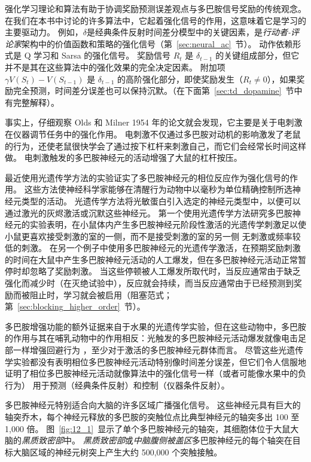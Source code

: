 强化学习理论和算法有助于协调奖励预测误差观点与多巴胺信号奖励的传统观念。
在我们在本书中讨论的许多算法中，它起着强化信号的作用，这意味着它是学习的主要驱动力。
例如，$ \delta $是经典条件反射时间差分模型中的关键因素，是\textit{行动者-评论家}架构中的价值函数和策略的强化信号（第~\ref{sec:neural_ac}~节）。
动作依赖形式是 Q 学习和 Sarsa 的强化信号。
奖励信号 $ R_t $ 是 $ \delta_{t-1} $ 的关键组成部分，但它并不是其在这些算法中的强化效果的完全决定因素。
附加项 $ \gamma V(S_t) - V(S_{t-1}) $ 是 $ \delta_{t-1} $ 的高阶强化部分，即使奖励发生（$ R_t \neq 0 $），如果奖励完全预测，时间差分误差也可以保持沉默。（在下面第~\ref{sec:td_dopamine}~节中有完整解释）。


事实上，仔细观察 Olds 和 Milner 1954 年的论文就会发现，它主要是关于电刺激在仪器调节任务中的强化作用。
电刺激不仅通过多巴胺对动机的影响激发了老鼠的行为，还使老鼠很快学会了通过按下杠杆来刺激自己，而它们会经常长时间这样做。
电刺激触发的多巴胺神经元的活动增强了大鼠的杠杆按压。


最近使用光遗传学方法的实验证实了多巴胺神经元的相位反应作为强化信号的作用。
这些方法使神经科学家能够在清醒行为动物中以毫秒为单位精确控制所选神经元类型的活动。
光遗传学方法将光敏蛋白引入选定的神经元类型中，以便可以通过激光的灰烬激活或沉默这些神经元。
第一个使用光遗传学方法研究多巴胺神经元的实验表明，在小鼠体内产生多巴胺神经元阶段性激活的光遗传学刺激足以使小鼠更喜欢接受刺激的室的一侧，而不是接受刺激的室的另一侧 无刺激或频率较低的刺激\cite{tsai2009phasic}。
在另一个例子中\cite{steinberg2013causal}使用多巴胺神经元的光遗传学激活，在预期奖励刺激的时间在大鼠中产生多巴胺神经元活动的人工爆发，但在多巴胺神经元活动正常暂停时却忽略了奖励刺激。
当这些停顿被人工爆发所取代时，当反应通常由于缺乏强化而减少时（在灭绝试验中），反应就会持续，而当反应通常由于已经预测到奖励而被阻止时，学习就会被启用（阻塞范式； 第~\ref{sec:blocking_higher_order}~节）。


多巴胺增强功能的额外证据来自于水果的光遗传学实验，但在这些动物中，多巴胺的作用与其在哺乳动物中的作用相反：光触发的多巴胺神经元活动爆发就像电击足部一样增强回避行为 ，至少对于激活的多巴胺神经元群体而言\cite{claridge2009writing}。
尽管这些光遗传学实验都没有表明相位多巴胺神经元活动特别像时间差分误差，但它们令人信服地证明了相位多巴胺神经元活动就像算法中的强化信号一样（或者可能像水果中的负行为） 用于预测（经典条件反射）和控制（仪器条件反射）。


多巴胺神经元特别适合向大脑的许多区域广播强化信号。
这些神经元具有巨大的轴突乔木，每个神经元释放的多巴胺的突触位点比典型神经元的轴突多出 100 至 1,000 倍。
图~\ref{fig:12_1}~显示了单个多巴胺神经元的轴突，其细胞体位于大鼠大脑的\textit{黑质致密部}中。
\textit{黑质致密部}或\textit{中脑腹侧被盖区}多巴胺神经元的每个轴突在目标大脑区域的神经元树突上产生大约 500,000 个突触接触。


